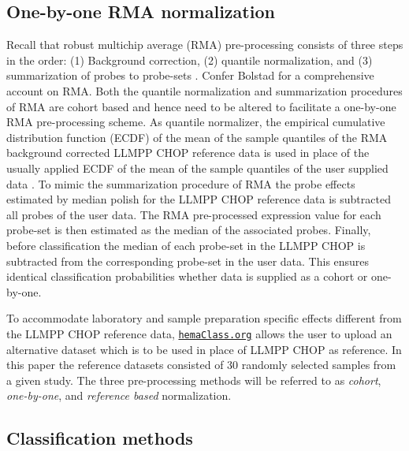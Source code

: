 \documentclass[twocolumn]{bmcart}%
\newcommand{\hemaClass}{\href{http://hemaClass.org}{\texttt{hemaClass.org}}}
\begin{document}
\subsection{One-by-one RMA normalization}
Recall that robust multichip average (RMA) pre-processing consists of three steps in the order:
(1) Background correction,
(2) quantile normalization, and
(3) summarization of probes to probe-sets \cite{Irizarry2003,Irizarry2003b}.
Confer Bolstad \cite{Bolstad2004} for a comprehensive account on RMA.
Both the quantile normalization and summarization procedures of RMA are cohort based and hence need to be altered to facilitate a one-by-one RMA pre-processing scheme.
As quantile normalizer, the empirical cumulative distribution function (ECDF) of the mean of the sample quantiles of the RMA background corrected LLMPP CHOP reference data is used in place of the usually applied ECDF of the mean of the sample quantiles of the user supplied data \cite{Bolstad2003}.
To mimic the summarization procedure of RMA \cite{Irizarry2003b} the probe effects estimated by median polish for the LLMPP CHOP reference data is subtracted all probes of the user data.
The RMA pre-processed expression value for each probe-set is then estimated as the median of the associated probes.
Finally, before classification the median of each probe-set in the LLMPP CHOP is subtracted from the corresponding probe-set in the user data.
This ensures identical classification probabilities whether data is supplied as a cohort or one-by-one.

To accommodate laboratory and sample preparation specific effects different from the LLMPP CHOP reference data, \hemaClass{} allows the user to upload an alternative dataset which is to be used in place of LLMPP CHOP as reference.
In this paper the reference datasets consisted of $30$ randomly selected samples from a given study.
The three pre-processing methods will be referred to as \emph{cohort}, \emph{one-by-one}, and \emph{reference based} normalization.



\subsection{Classification methods}
\end{document}
